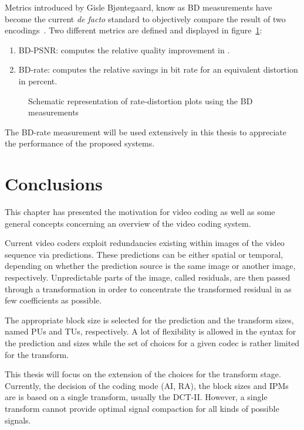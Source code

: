 \documentclass[11pt,a4paper,openright,twoside]{book}
\numberwithin{equation}{section} %
\numberwithin{figure}{section} %
\numberwithin{table}{section} %
\begin{document}
Metrics introduced by Gisle Bjøntegaard, know as \ac{BD} measurements have
become the current \emph{de facto} standard to objectively compare the result
of two encodings~\cite{VCEG-M33,VCEG-AI11}.
Two different metrics are defined and displayed in
figure~\ref{fig:bdsnr_bdrate}:
\begin{enumerate}[label = (\alph{enumi})]
	\item \ac{BD}-\ac{PSNR}: computes the relative quality improvement
		in \deci\bel.
	\item \ac{BD}-rate: computes the relative savings in bit rate for an
		equivalent distortion in percent.
\end{enumerate}

\begin{figure}[tb]
	\centering
	\hfill
	\caption{Schematic representation of rate-distortion plots using the
	\ac{BD} measurements}
	\label{fig:bdsnr_bdrate}
\end{figure}

The \ac{BD}-rate measurement will be used extensively in this thesis to
appreciate the performance of the proposed systems.

\section{Conclusions}
\label{sec:conclusions_video_coding}

This chapter has presented the motivation for video coding as well as some
general concepts concerning an overview of the video coding system.

Current video coders exploit redundancies existing within images of the video
sequence via predictions.
These predictions can be either spatial or temporal, depending on
whether the prediction source is the same image or another image,
respectively.
Unpredictable parts of the image, called residuals, are then passed through a
transformation in order to concentrate the transformed residual in as few
coefficients as possible.

The appropriate block size is selected for the prediction and the transform
sizes, named \acp{PU} and \acp{TU}, respectively.
A lot of flexibility is allowed in the syntax for the prediction and sizes
while the set of choices for a given codec is rather limited for the
transform.

This thesis will focus on the extension of the choices for the transform
stage.
Currently, the decision of the coding mode (\ac{AI}, \ac{RA}), the block sizes
and \acp{IPM} are is based on a single transform, usually the \ac{DCT}-II.
However, a single transform cannot provide optimal signal compaction for all
kinds of possible signals.
\end{document}
